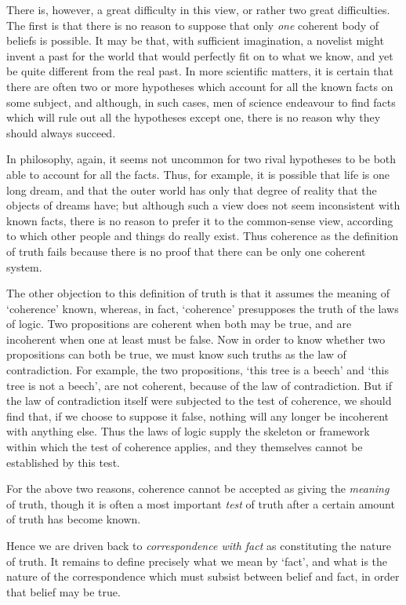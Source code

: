 \documentclass[oneside,letterpaper,12pt]{book}
\begin{document}
There is, however, a great difficulty in this view, or rather two great
difficulties. \label{multiple} The first is that there is no reason to suppose that only
\emph{one} coherent body of beliefs is possible. It may be that, with
sufficient imagination, a novelist might invent a past for the world
that would perfectly fit on to what we know, and yet be quite different
from the real past. In more scientific matters, it is certain that there
are often two or more hypotheses which account for all the known facts
on some subject, and although, in such cases, men of science endeavour
to find facts which will rule out all the hypotheses except one, there
is no reason why they should always succeed.

In philosophy, again, it seems not uncommon for two rival hypotheses to
be both able to account for all the facts. Thus, for example, it is
possible that life is one long dream, and that the outer world has only
that degree of reality that the objects of dreams have; but although
such a view does not seem inconsistent with known facts, there is no
reason to prefer it to the common-sense view, according to which other
people and things do really exist. Thus coherence as the definition of
truth fails because there is no proof that there can be only one
coherent system.

The other objection to this definition of truth is that it assumes the
meaning of `coherence' known, whereas,
in fact, `coherence' presupposes the
truth of the laws of logic. \label{laws} Two propositions are coherent when both may
be true, and are incoherent when one at least must be false. Now in
order to know whether two propositions can both be true, we must know
such truths as the law of contradiction. For example, the two
propositions, `this tree is a beech'
and `this tree is not a beech', are not
coherent, because of the law of contradiction. But if the law of
contradiction itself were subjected to the test of coherence, we should
find that, if we choose to suppose it false, nothing will any longer be
incoherent with anything else. Thus the laws of logic supply the
skeleton or framework within which the test of coherence applies, and
they themselves cannot be established by this test.

For the above two reasons, coherence cannot be accepted as giving the
\emph{meaning} of truth, though it is often a most important \emph{test}
of truth after a certain amount of truth has become known.

Hence we are driven back to \emph{correspondence with fact} as
constituting the nature of truth. It remains to define precisely what we
mean by `fact', and what is the nature of
the correspondence which must subsist between belief and fact, in order
that belief may be true.
\end{document}
